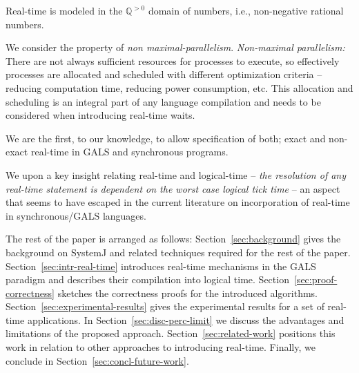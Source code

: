 \begin{enumerate*}
\item Real-time is modeled in the $\mathbb{Q}^{>0}$ domain of numbers,
 i.e., non-negative rational numbers.
\item We consider the property of \textit{non
    maximal-parallelism}. \textit{Non-maximal parallelism:} There are
  not always sufficient resources for processes to execute, so
  effectively processes are allocated and scheduled with different
  optimization criteria -- reducing computation time, reducing power
  consumption, etc. This allocation and scheduling is an integral part
  of any language compilation and needs to be considered when
  introducing real-time waits.
\item We are the first, to our knowledge, to allow specification of
  both; exact and non-exact real-time in GALS and synchronous programs.
\item We  upon a key insight relating real-time and
  logical-time -- \textit{the resolution of any real-time statement is
    dependent on the worst case logical tick time} -- an aspect that
  seems to have escaped in the current literature on incorporation of
  real-time in synchronous/GALS languages.
\end{enumerate*}

The rest of the paper is arranged as follows:
Section~\ref{sec:background} gives the background on SystemJ and related
techniques required for the rest of the
paper. Section~\ref{sec:intr-real-time} introduces real-time mechanisms
in the GALS paradigm and describes their compilation into logical
time. Section~\ref{sec:proof-correctness} sketches the correctness
proofs for the introduced
algorithms. Section~\ref{sec:experimental-results} gives the
experimental results for a set of real-time applications. In
Section~\ref{sec:disc-perc-limit} we discuss the advantages and
limitations of the proposed approach. Section~\ref{sec:related-work}
positions this work in relation to other approaches to introducing
real-time. Finally, we conclude in Section~\ref{sec:concl-future-work}.


